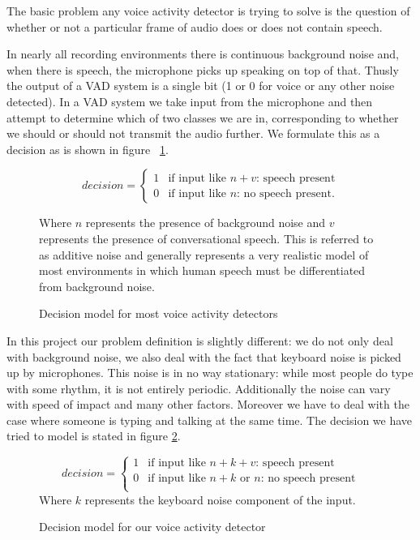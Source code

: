 \documentclass[ %
                    author={Sam Phippen},
                supervisor={Dr. Rafal Bogacz},
                     title={Real time voice activity detectors in noisy personal computing environments},
                  subtitle={},
                    degree={MEng},
                      year={2012} ]{thesis}
\begin{document}
The basic problem any voice activity detector is trying to solve is the
question of whether or not a particular frame of audio does or does not contain
speech.

In nearly all recording environments there is continuous background noise and,
when there is speech, the microphone picks up speaking on top of that. Thusly
the output of a VAD system is a single bit (1 or 0 for voice or any other noise
detected). In a VAD system we take input from the microphone and then attempt
to determine which of two classes we are in, corresponding to whether we
should or should not transmit the audio further. We formulate this as a
decision as is shown in figure ~\ref{fig:decision1}.

\begin{figure}
        \[ decision = \left\{ \begin{array}{ll}
                    1 & \mbox{if input like $n + v$: speech present}\\
            0 & \mbox{if input like $n$: no speech present}.\end{array} \right. \]


                    Where $n$ represents the presence of background noise and $v$ represents the
                    presence of conversational speech. This is referred to as additive
                    noise\cite{sohn} and generally represents a very realistic model of most
                    environments in which human speech must be differentiated from background noise.

                    \caption{Decision model for most voice activity detectors}
                    \label{fig:decision1}

\end{figure}


In this project our problem definition is slightly different: we do not only
deal with background noise, we also deal with the fact that keyboard noise is
picked up by microphones. This noise is in no way stationary: while most people
do type with some rhythm, it is not entirely periodic. Additionally the noise
can vary with speed of impact and many other factors. Moreover we have
to deal with the case where someone is typing and talking at the same time.
The decision we have tried to model is stated in  figure \ref{eqn:decision 2}.

\begin{figure}
\[ decision = \left\{ \begin{array}{ll}
            1 & \mbox{if input like $n + k + v$: speech present}\\
            0 & \mbox{if input like $n + k$ or $n$: no speech present}\\

    \end{array} \right. \]
            Where $k$ represents the keyboard noise component of the input.
            \caption{Decision model for our voice activity detector}
            \label{eqn:decision 2}
\end{figure}
\end{document}
